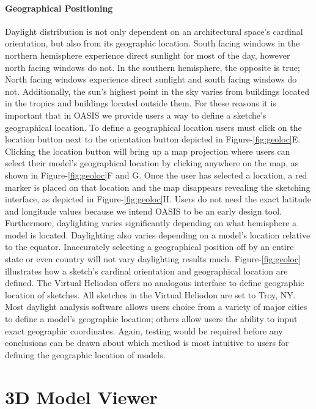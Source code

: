 \paragraph{Geographical Positioning}
Daylight distribution is  not only dependent on an architectural space's cardinal orientation, but also from its geographic location.  South facing windows in the northern hemisphere experience direct sunlight for most of the day, however north facing windows do not.  In the southern hemisphere, the opposite is true; North facing windows experience direct sunlight and south facing windows do not.  Additionally, the sun's highest point in the sky varies from buildings located in the tropics and buildings located outside them.  For these reasons it is important that in OASIS we provide users a way to define a sketche's geographical location.  To define a geographical location users must click on the location button next to the orientation button depicted in Figure-\ref{fig:geoloc}E.  Clicking the location button will bring up a map projection where users can select their model's geographical location by clicking anywhere on the map, as shown in Figure-\ref{fig:geoloc}F and G.  Once the user has selected a location, a red marker is placed on that location and the map  disappears revealing the sketching interface, as depicted in Figure-\ref{fig:geoloc}H.  Users do not need the exact latitude and longitude values because we intend OASIS to be an early design tool.  Furthermore, daylighting varies significantly depending on what hemisphere a model is located. Daylighting also varies depending on a model's location relative to the equator.  Inaccurately selecting a geographical position off by an entire state or even country will not vary daylighting results much.  Figure-\ref{fig:geoloc} illustrates how a sketch's cardinal orientation and geographical location are defined.  The Virtual Heliodon offers no analogous interface to define geographic location of sketches.  All sketches in the Virtual Heliodon are set to Troy, NY.  Most daylight analysis software allows users choice from a variety of major cities to define a model's geographic location; others allow users the ability to input exact geographic coordinates.  Again, testing would be required before any conclusions can be drawn about which method is most intuitive to users for defining the geographic location of models.\\ 

\section{3D Model Viewer}

